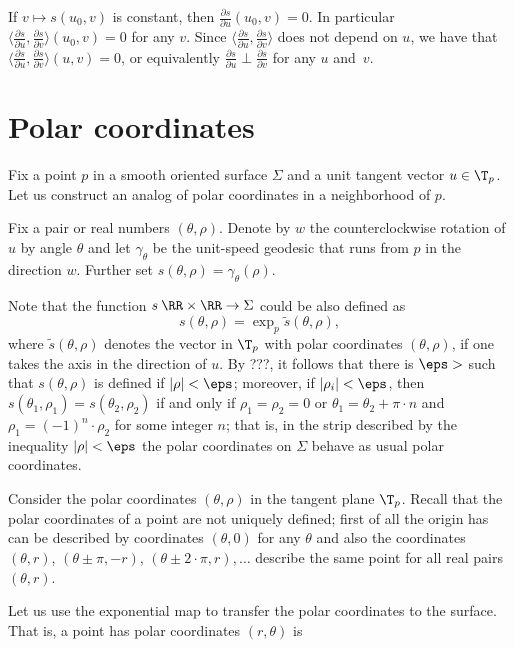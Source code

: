 If $v\mapsto s(u_0,v)$ is constant, then $\tfrac{\partial s}{\partial u}(u_0,v)=0$.
In particular $\langle\tfrac{\partial s}{\partial u},\tfrac{\partial s}{\partial v}\rangle(u_0,v)=0$ for any $v$.
Since $\langle\tfrac{\partial s}{\partial u},\tfrac{\partial s}{\partial v}\rangle$ does not depend on $u$, we have that $\langle\tfrac{\partial s}{\partial u},\tfrac{\partial s}{\partial v}\rangle(u,v)=0$, or equivalently
$\tfrac{\partial s}{\partial u}\perp \tfrac{\partial s}{\partial v}$ for any $u$ and~$v$.
\qeds

\section*{Polar coordinates}

Fix a point $p$ in a smooth oriented surface $\Sigma$ and a unit tangent vector $u\in\T_p$.
Let us construct an analog of polar coordinates in a neighborhood of $p$.

Fix a pair or real numbers $(\theta,\rho)$.
Denote by $w$ the counterclockwise rotation of $u$ by angle $\theta$ and let $\gamma_\theta$ be the unit-speed geodesic that runs from $p$ in the direction $w$.
Further set $s(\theta,\rho)=\gamma_\theta(\rho)$.

Note that the function $s\:\RR\times \RR\to \Sigma$ could be also defined as 
\[s(\theta,\rho)=\exp_p\tilde s(\theta,\rho),\]
where $\tilde s(\theta,\rho)$ denotes the vector in $\T_p$ with polar coordinates $(\theta,\rho)$, if one takes the axis in the direction of $u$.
By ???, it follows that there is $\eps>$ such that $s(\theta,\rho)$ is defined if $|\rho|<\eps$;
moreover, if $|\rho_i|<\eps$, then $s(\theta_1,\rho_1)=s(\theta_2,\rho_2)$ if and only if $\rho_1=\rho_2=0$ or $\theta_1=\theta_2+\pi\cdot n$ and $\rho_1=(-1)^n\cdot \rho_2$ for some integer $n$;
that is, in the strip described by the inequality $|\rho|<\eps$ the polar coordinates on $\Sigma$ behave as usual polar coordinates.

Consider the polar coordinates $(\theta,\rho)$ in the tangent plane $\T_p$.
Recall that the polar coordinates of a point are not uniquely defined;
first of all the origin has can be described by coordinates $(\theta,0)$ for any $\theta$ and also 
the coordinates $(\theta,r)$, $(\theta\pm\pi,-r)$, $(\theta\pm2\cdot \pi,r),\dots$ describe the same point for all real pairs $(\theta,r)$.

Let us use the exponential map to transfer the polar coordinates to the surface.
That is, a point has polar coordinates $(r,\theta)$ is 


